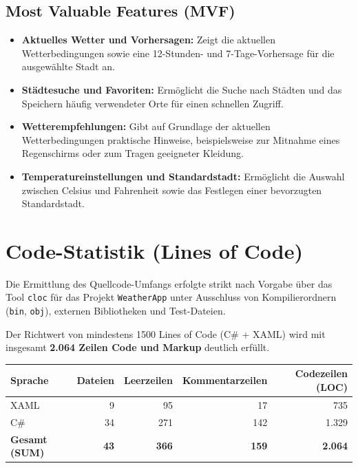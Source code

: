 \documentclass[12pt,a4paper]{article}
\begin{document}
\subsection{Most Valuable Features (MVF)}
\begin{itemize}
  \item \textbf{Aktuelles Wetter und Vorhersagen:} Zeigt die aktuellen
    Wetterbedingungen sowie eine 12-Stunden- und 7-Tage-Vorhersage für
    die ausgewählte Stadt an.
  \item \textbf{Städtesuche und Favoriten:} Ermöglicht die Suche nach
    Städten und das Speichern häufig verwendeter Orte für einen
    schnellen Zugriff.
  \item \textbf{Wetterempfehlungen:} Gibt auf Grundlage der aktuellen
    Wetterbedingungen praktische Hinweise, beispielsweise zur Mitnahme
    eines Regenschirms oder zum Tragen geeigneter Kleidung.
  \item \textbf{Temperatureinstellungen und Standardstadt:} Ermöglicht
    die Auswahl zwischen Celsius und Fahrenheit sowie das Festlegen
    einer bevorzugten Standardstadt.
\end{itemize}

\newpage
\section{Code-Statistik (Lines of Code)}
Die Ermittlung des Quellcode-Umfangs erfolgte strikt nach Vorgabe
über das Tool \texttt{cloc} für das Projekt
\texttt{WeatherApp} unter Ausschluss von Kompilierordnern (\texttt{bin},
\texttt{obj}), externen Bibliotheken und Test-Dateien.

Der Richtwert von mindestens 1500 Lines of Code (C\# + XAML) wird mit
insgesamt \textbf{2.064 Zeilen Code und Markup} deutlich erfüllt.

\vspace{0.8em}
\noindent
\renewcommand{\arraystretch}{1.2}
\begin{tabular}{|p{4cm}|r|r|r|r|}
  \hline
  \textbf{Sprache} & \textbf{Dateien} & \textbf{Leerzeilen} &
  \textbf{Kommentarzeilen} & \textbf{Codezeilen (LOC)} \\
  \hline
  XAML & 9 & 95 & 17 & 735 \\
  \hline
  C\# & 34 & 271 & 142 & 1.329 \\
  \hline
  \textbf{Gesamt (SUM)} & \textbf{43} & \textbf{366} & \textbf{159} &
  \textbf{2.064} \\
  \hline
\end{tabular}
\end{document}
